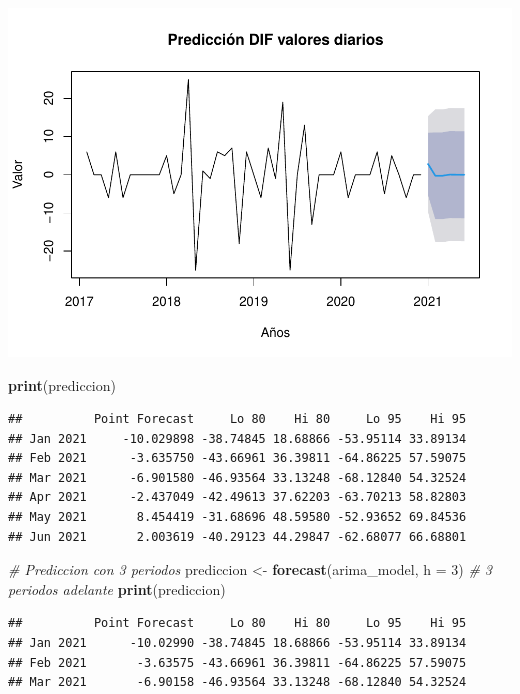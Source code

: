 \documentclass[
]{book}
\newenvironment{Shaded}{\begin{snugshade}}{\end{snugshade}}
\newcommand{\AttributeTok}[1]{\textcolor[rgb]{0.13,0.29,0.53}{#1}}
\newcommand{\CommentTok}[1]{\textcolor[rgb]{0.56,0.35,0.01}{\textit{#1}}}
\newcommand{\DecValTok}[1]{\textcolor[rgb]{0.00,0.00,0.81}{#1}}
\newcommand{\FunctionTok}[1]{\textcolor[rgb]{0.13,0.29,0.53}{\textbf{#1}}}
\newcommand{\NormalTok}[1]{#1}
\newcommand{\OtherTok}[1]{\textcolor[rgb]{0.56,0.35,0.01}{#1}}
\begin{document}
\includegraphics{_main_files/figure-latex/unnamed-chunk-20-1.pdf}

\begin{Shaded}
\begin{Highlighting}[]
\FunctionTok{print}\NormalTok{(prediccion)}
\end{Highlighting}
\end{Shaded}

\begin{verbatim}
##          Point Forecast     Lo 80    Hi 80     Lo 95    Hi 95
## Jan 2021     -10.029898 -38.74845 18.68866 -53.95114 33.89134
## Feb 2021      -3.635750 -43.66961 36.39811 -64.86225 57.59075
## Mar 2021      -6.901580 -46.93564 33.13248 -68.12840 54.32524
## Apr 2021      -2.437049 -42.49613 37.62203 -63.70213 58.82803
## May 2021       8.454419 -31.68696 48.59580 -52.93652 69.84536
## Jun 2021       2.003619 -40.29123 44.29847 -62.68077 66.68801
\end{verbatim}

\begin{Shaded}
\begin{Highlighting}[]
\CommentTok{\# Prediccion con 3 periodos}
\NormalTok{prediccion }\OtherTok{\textless{}{-}} \FunctionTok{forecast}\NormalTok{(arima\_model, }\AttributeTok{h =} \DecValTok{3}\NormalTok{) }\CommentTok{\# 3 periodos adelante}
\FunctionTok{print}\NormalTok{(prediccion)}
\end{Highlighting}
\end{Shaded}

\begin{verbatim}
##          Point Forecast     Lo 80    Hi 80     Lo 95    Hi 95
## Jan 2021      -10.02990 -38.74845 18.68866 -53.95114 33.89134
## Feb 2021       -3.63575 -43.66961 36.39811 -64.86225 57.59075
## Mar 2021       -6.90158 -46.93564 33.13248 -68.12840 54.32524
\end{verbatim}
\end{document}

